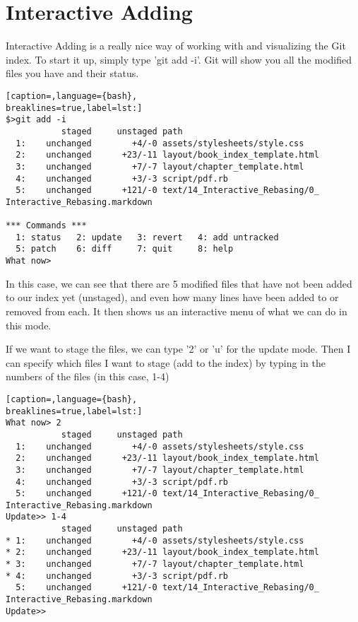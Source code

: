 \section{Interactive Adding}
Interactive Adding is a really nice way of working with and visualizing the Git
index. To start it up, simply type 'git add -i'. Git will show you all the
modified files you have and their status.
\lstset{basicstyle=\scriptsize, numbers=none, captionpos=b, tabsize=4}
\begin{lstlisting}[caption=,language={bash},
breaklines=true,label=lst:]
$>git add -i
           staged     unstaged path
  1:    unchanged        +4/-0 assets/stylesheets/style.css
  2:    unchanged      +23/-11 layout/book_index_template.html
  3:    unchanged        +7/-7 layout/chapter_template.html
  4:    unchanged        +3/-3 script/pdf.rb
  5:    unchanged      +121/-0 text/14_Interactive_Rebasing/0_ Interactive_Rebasing.markdown

*** Commands ***
  1: status   2: update   3: revert   4: add untracked
  5: patch    6: diff     7: quit     8: help
What now> 
\end{lstlisting}

In this case, we can see that there are 5 modified files that have not been
added to our index yet (unstaged), and even how many lines have been added to
or removed from each. It then shows us an interactive menu of what we can do in
this mode.

If we want to stage the files, we can type '2' or 'u' for the update mode. Then
I can specify which files I want to stage (add to the index) by typing in the
numbers of the files (in this case, 1-4)
\lstset{basicstyle=\scriptsize, numbers=none, captionpos=b, tabsize=4}
\begin{lstlisting}[caption=,language={bash},
breaklines=true,label=lst:]
What now> 2
           staged     unstaged path
  1:    unchanged        +4/-0 assets/stylesheets/style.css
  2:    unchanged      +23/-11 layout/book_index_template.html
  3:    unchanged        +7/-7 layout/chapter_template.html
  4:    unchanged        +3/-3 script/pdf.rb
  5:    unchanged      +121/-0 text/14_Interactive_Rebasing/0_ Interactive_Rebasing.markdown
Update>> 1-4
           staged     unstaged path
* 1:    unchanged        +4/-0 assets/stylesheets/style.css
* 2:    unchanged      +23/-11 layout/book_index_template.html
* 3:    unchanged        +7/-7 layout/chapter_template.html
* 4:    unchanged        +3/-3 script/pdf.rb
  5:    unchanged      +121/-0 text/14_Interactive_Rebasing/0_ Interactive_Rebasing.markdown
Update>> 
\end{lstlisting}

